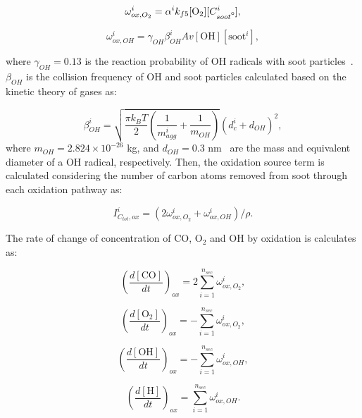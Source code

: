 \begin{equation}
	\omega^i_{ox,O_2} = \alpha^i k_{f5} [\mathrm{O_2}][C^i_{soot\mbox{\textdegree}}],
	\label{eqn:hacaO2Rate}
\end{equation}

\begin{equation}
	\omega^i_{ox,OH} = \gamma_{OH} \beta^i_{OH} Av [\mathrm{OH}][\mathrm{soot}^i],
	\label{eqn:hacaOHRate}
\end{equation}

\noindent where $\gamma_{OH}=0.13$ is the reaction probability of OH radicals with soot particles~\citep{appel2000kinetic}. $\beta_{OH}$ is the collision frequency of OH and soot particles calculated based on the kinetic theory of gases as:

\begin{equation}
	\beta^i_{OH} = 
	\sqrt{
		\frac{\pi k_B T}{2}\left(\frac{1}{m^i_{agg}}+\frac{1}{m_{OH}}\right)
	}
	\left(d^i_c+d_{OH}\right)^2,
	\label{eqn:betaOH}
\end{equation}
\noindent where $m_{OH}=2.824\times10^{-26}$ kg, and $d_{OH}=0.3$ nm~\citep{shepherd2022measurement} are the mass and equivalent diameter of a OH radical, respectively. Then, the oxidation source term is calculated considering the number of carbon atoms removed from soot through each oxidation pathway as:

\begin{equation}
	I^i_{C_{tot},ox} = (2\omega^i_{ox,O_2} + \omega^i_{ox,OH})/\rho
	\label{eqn:ICtot}.
\end{equation}

The rate of change of concentration of CO, $\mathrm{O_2}$ and OH by oxidation is calculates as:

\begin{equation}
	\left(\frac{d\left[{\mathrm{CO}}\right]}{dt}\right)_{ox} = 2\sum_{i=1}^{n_{sec}}\omega^i_{ox,O_2},
	\label{eqn:COrate_ox}
\end{equation}

\begin{equation}
	\left(\frac{d\left[{\mathrm{O_2}}\right]}{dt}\right)_{ox} = -\sum_{i=1}^{n_{sec}}\omega^i_{ox,O_2},
	\label{eqn:O2rate_ox}
\end{equation}

\begin{equation}
	\left(\frac{d\left[{\mathrm{OH}}\right]}{dt}\right)_{ox} = -\sum_{i=1}^{n_{sec}}\omega^i_{ox,OH},
	\label{eqn:Hrate_ox}
\end{equation}

\begin{equation}
	\left(\frac{d\left[{\mathrm{H}}\right]}{dt}\right)_{ox} = \sum_{i=1}^{n_{sec}}\omega^i_{ox,OH}.
	\label{eqn:OHrate_ox}
\end{equation}